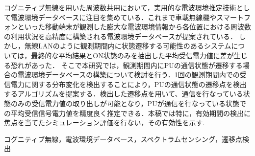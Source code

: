 \documentclass[technicalreport]{ieicej}
\begin{document}
\begin{jabstract}
 コグニティブ無線を用いた周波数共用において，実用的な電波環境推定技術として電波環境データベースに注目を集めている．これまで車載無線機やスマートフォンといった移動端末が観測した膨大な電波環境情報から各位置における周波数の利用状況を高精度に構築される電波環境データベースが提案されている．
しかし，無線LANのように観測期間内に状態遷移する可能性のあるシステムについては，最終的な平均結果とON状態のみを抽出した平均受信電力値に差が生じる恐れがあった．
そこで本研究では，観測期間内にPUの通信状態が遷移する場合の電波環境データベースの構築について検討を行う．1回の観測期間内での受信電力に関する分布変化を検出することにより，PUの通信状態の遷移点を検出するアルゴリズムを提案する．検出した遷移点を用いて、通信を行なっている状態のみの受信電力値の取り出しが可能となり，PUが通信を行なっている状態での平均受信信号電力値を精度良く推定できる．本稿では特に，有効期間の検出に焦点を当てたシミュレーション評価を行ない，その有効性を示す.
\end{jabstract}
\begin{jkeyword}
コグニティブ無線，電波環境データベース，スペクトラムセンシング，遷移点検出
\end{jkeyword}
\end{document}
